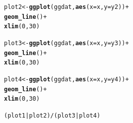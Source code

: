 \documentclass{article}\usepackage[]{graphicx}\usepackage[]{color}
\makeatletter
\newcommand{\hlnum}[1]{\textcolor[rgb]{0.686,0.059,0.569}{#1}}%
\newcommand{\hlopt}[1]{\textcolor[rgb]{0,0,0}{#1}}%
\newcommand{\hlstd}[1]{\textcolor[rgb]{0.345,0.345,0.345}{#1}}%
\newcommand{\hlkwb}[1]{\textcolor[rgb]{0.69,0.353,0.396}{#1}}%
\newcommand{\hlkwc}[1]{\textcolor[rgb]{0.333,0.667,0.333}{#1}}%
\newcommand{\hlkwd}[1]{\textcolor[rgb]{0.737,0.353,0.396}{\textbf{#1}}}%
\newenvironment{kframe}{%
 \def\at@end@of@kframe{}%
 \ifinner\ifhmode%
  \def\at@end@of@kframe{\end{minipage}}%
  \begin{minipage}{\columnwidth}%
 \fi\fi%
 \def\FrameCommand##1{\hskip\@totalleftmargin \hskip-\fboxsep
 \colorbox{shadecolor}{##1}\hskip-\fboxsep
     \hskip-\linewidth \hskip-\@totalleftmargin \hskip\columnwidth}%
 \MakeFramed {\advance\hsize-\width
   \@totalleftmargin\z@ \linewidth\hsize
   \@setminipage}}%
 {\par\unskip\endMakeFramed%
 \at@end@of@kframe}
\newenvironment{knitrout}{}{} %
\makeatother
\begin{document}
\begin{enumerate}
\begin{enumerate}
\begin{knitrout}
\begin{kframe}
\begin{alltt}
\hlstd{plot2}\hlkwb{<-}\hlkwd{ggplot}\hlstd{(ggdat,} \hlkwd{aes}\hlstd{(}\hlkwc{x}\hlstd{=x,} \hlkwc{y}\hlstd{=y2))}\hlopt{+}
  \hlkwd{geom_line}\hlstd{()}\hlopt{+}
  \hlkwd{xlim}\hlstd{(}\hlnum{0}\hlstd{,}\hlnum{30}\hlstd{)}

\hlstd{plot3}\hlkwb{<-}\hlkwd{ggplot}\hlstd{(ggdat,} \hlkwd{aes}\hlstd{(}\hlkwc{x}\hlstd{=x,} \hlkwc{y}\hlstd{=y3))}\hlopt{+}
  \hlkwd{geom_line}\hlstd{()}\hlopt{+}
  \hlkwd{xlim}\hlstd{(}\hlnum{0}\hlstd{,}\hlnum{30}\hlstd{)}

\hlstd{plot4}\hlkwb{<-}\hlkwd{ggplot}\hlstd{(ggdat,} \hlkwd{aes}\hlstd{(}\hlkwc{x}\hlstd{=x,} \hlkwc{y}\hlstd{=y4))}\hlopt{+}
  \hlkwd{geom_line}\hlstd{()}\hlopt{+}
  \hlkwd{xlim}\hlstd{(}\hlnum{0}\hlstd{,}\hlnum{30}\hlstd{)}

\hlstd{(plot1}\hlopt{|}\hlstd{plot2)}\hlopt{/}\hlstd{(plot3}\hlopt{|}\hlstd{plot4)}
\end{alltt}


{\ttfamily\noindent\color{warningcolor}{\#\# Warning: Removed 700 row(s) containing missing values (geom\_path).}}

{\ttfamily\noindent\color{warningcolor}{\#\# Warning: Removed 700 row(s) containing missing values (geom\_path).}}

{\ttfamily\noindent\color{warningcolor}{\#\# Warning: Removed 700 row(s) containing missing values (geom\_path).}}


\end{kframe}
\end{knitrout}
\end{enumerate}
\end{enumerate}
\end{document}
